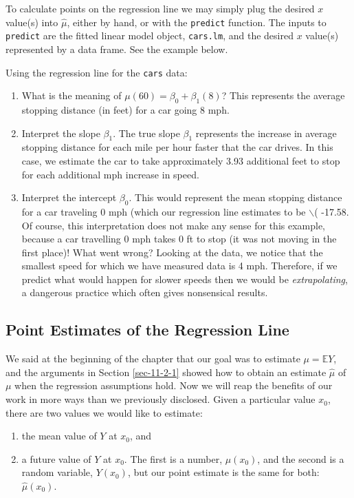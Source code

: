 To calculate points on the regression line we may simply plug the
desired \(x\) value(s) into \( \hat{\mu} \), either by hand, or with
the \texttt{predict} function. The inputs to \texttt{predict} are the fitted linear
model object, \texttt{cars.lm}, and the desired \(x\) value(s) represented by
a data frame. See the example below.

\label{exa-regline-cars-interpret} Using the regression line for the
\texttt{cars} data:
\begin{enumerate}
\item What is the meaning of \( \mu(60) = \beta_{0} + \beta_{1}(8) \)?
This represents the average stopping distance (in feet) for a car
going 8 mph.
\item Interpret the slope \(\beta_{1}\). The true slope \(\beta_{1}\)
represents the increase in average stopping distance for each mile
per hour faster that the car drives. In this case, we estimate the
car to take approximately 3.93 additional feet
to stop for each additional mph increase in speed.
\item Interpret the intercept \( \beta_{0} \). This would represent the
mean stopping distance for a car traveling 0 mph (which our
regression line estimates to be $\backslash$( -17.58. Of
course, this interpretation does not make any sense for this
example, because a car travelling 0 mph takes 0 ft to stop (it was
not moving in the first place)! What went wrong? Looking at the
data, we notice that the smallest speed for which we have measured
data is 4 mph. Therefore, if we predict what would happen for
slower speeds then we would be \emph{extrapolating}, a dangerous
practice which often gives nonsensical results.
\end{enumerate}

\subsection{Point Estimates of the Regression Line}
\label{sec-11-2-2}

We said at the beginning of the chapter that our goal was to estimate
\( \mu = \mathbb{E} Y \), and the arguments in Section
\ref{sec-11-2-1} showed how to obtain an estimate \(
\hat{\mu} \) of \( \mu \) when the regression assumptions hold. Now we
will reap the benefits of our work in more ways than we previously
disclosed. Given a particular value \(x_{0}\), there are two values we
would like to estimate:
\begin{enumerate}
\item the mean value of \(Y\) at \(x_{0}\), and
\item a future value of \(Y\) at \(x_{0}\). The first is a number,
\(\mu(x_{0})\), and the second is a random variable, \(Y(x_{0})\),
but our point estimate is the same for both: \(\hat{\mu}(x_{0})\).
\end{enumerate}

